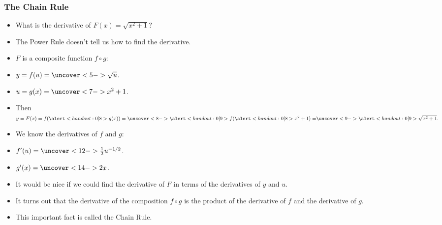 \begin{frame}
\frametitle{The Chain Rule}
\begin{itemize}
\item  What is the derivative of $F(x) = \sqrt{x^2 + 1}$?
\item<2->  The Power Rule doesn't tell us how to find the derivative.
\item<3->  $F$ is a composite function $f\circ g$:
\item<3-| alert@4-5,9,11-12>  $y = f(u) = \uncover<5->{\sqrt{u}}$.
\item<3-| alert@6-8,13-14>  $u = g(x) = \uncover<7->{x^2+1}$.
\item<3->  Then $y = F(x) = f(\alert<handout:0| 8>{g(x)}) = \uncover<8->{\alert<handout:0| 9>{f(\alert<handout:0| 8>{x^2+1}) =}}  \uncover<9->{\alert<handout:0| 9>{\sqrt{x^2+1}}.}$
\item<10->  We know the derivatives of $f$ and $g$:
\item<10-| alert@11-12>  $f'(u) = \uncover<12->{\frac{1}{2}u^{-1/2}}$.
\item<10-| alert@13-14>  $g'(x) = \uncover<14->{2x}$.
\item<15->  It would be nice if we could find the derivative of $F$ in terms of the derivatives of $y$ and $u$.
\item<16->  It turns out that the derivative of the composition $f\circ g$ is the product of the derivative of $f$ and the derivative of $g$.
\item<17->  This important fact is called the Chain Rule.
\end{itemize}
\end{frame}
